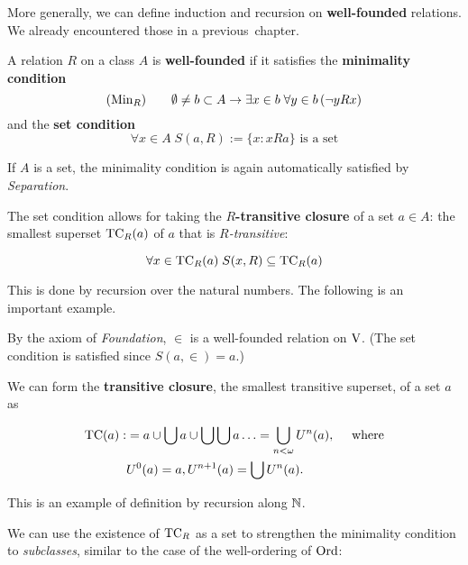More generally, we can define induction and recursion on \textbf{well-founded} relations. We already encountered those in a previous~chapter.

\begin{definition}\label{def-well-founded}A relation $R$ on a class $A$ is \textbf{well-founded} if it satisfies the \textbf{minimality condition}
\begin{equation*}
(\operatorname{Min}_R) \qquad  \emptyset \neq b \subset A \to \exists x \in b \; \forall y \in b \, (  \neg y R x)
\end{equation*}
and the \textbf{set condition}
\begin{equation*}
\forall x \in A \; S(a,R):= \{x \colon x R a\} \text{ is a set}
\end{equation*}
\end{definition}If $A$ is a set, the minimality condition is again automatically satisfied by \textit{Separation}.

The set condition allows for taking the \textbf{$R$-transitive closure} of a set $a \in A$: the smallest superset $\operatorname{TC}_R(a)$ of $a$ that is \textit{$R$-transitive}:

\begin{equation}
\forall x \in \operatorname{TC}_R(a)\; S(x,R) \subseteq  \operatorname{TC}_R(a)
\end{equation}

This is done by recursion over the natural numbers. The following is an important example.

\begin{example}\label{exa-trans-closure}By the axiom of \textit{Foundation}, $\in$ is a well-founded relation on $\operatorname{V}$. (The set condition is satisfied since $S(a,\in)=a$.)

We can form the \textbf{transitive closure}, the smallest transitive superset, of a set $a$ as

\begin{align*}
    \operatorname{TC}(a):&= a \cup \bigcup a \cup \bigcup \bigcup a \ldots 
 = \bigcup_{n< \omega} U^n(a), \quad \text{ where} \\ 
 &U^0(a) = a, U^{n+1}(a) = \bigcup U^n(a).
\end{align*}

This is an example of definition by recursion along $\mathbb{N}$.

\end{example}We can use the existence of $\operatorname{TC}_R$ as a set to strengthen the minimality condition to \textit{subclasses}, similar to the case of the well-ordering of $\operatorname{Ord}$:

